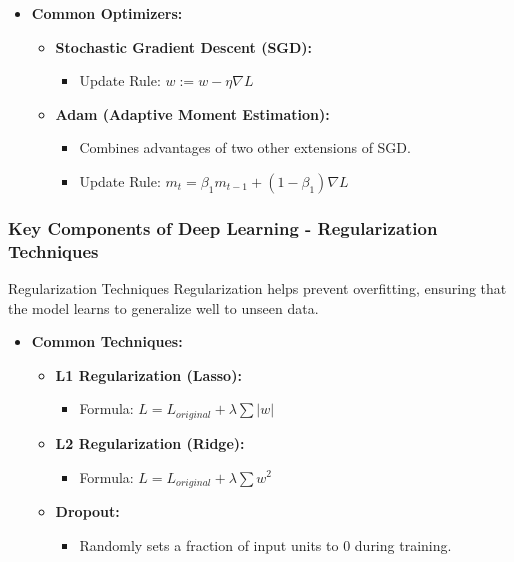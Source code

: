 \documentclass[aspectratio=169]{beamer}
\begin{document}
\begin{frame}[fragile]
    \begin{itemize}
        \item \textbf{Common Optimizers:}
        \begin{itemize}
            \item \textbf{Stochastic Gradient Descent (SGD):} 
                \begin{itemize}
                    \item Update Rule: \( w := w - \eta \nabla L \)
                \end{itemize}
            \item \textbf{Adam (Adaptive Moment Estimation):} 
                \begin{itemize}
                    \item Combines advantages of two other extensions of SGD.
                    \item Update Rule: \( m_t = \beta_1 m_{t-1} + (1 - \beta_1) \nabla L \)
                \end{itemize}
        \end{itemize}
    \end{itemize}
\end{frame}

\begin{frame}[fragile]
    \frametitle{Key Components of Deep Learning - Regularization Techniques}
    
    \begin{block}{Regularization Techniques}
        Regularization helps prevent overfitting, ensuring that the model learns to generalize well to unseen data.
    \end{block}

    \begin{itemize}
        \item \textbf{Common Techniques:}
        \begin{itemize}
            \item \textbf{L1 Regularization (Lasso):} 
                \begin{itemize}
                    \item Formula: \( L = L_{original} + \lambda \sum |w| \)
                \end{itemize}
            \item \textbf{L2 Regularization (Ridge):} 
                \begin{itemize}
                    \item Formula: \( L = L_{original} + \lambda \sum w^2 \)
                \end{itemize}
            \item \textbf{Dropout:} 
                \begin{itemize}
                    \item Randomly sets a fraction of input units to 0 during training.
                \end{itemize}
        \end{itemize}
    \end{itemize}
\end{frame}
\end{document}
